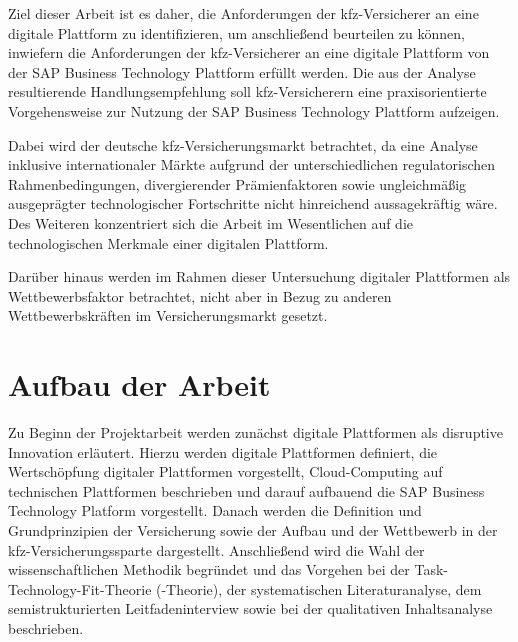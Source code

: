 Ziel dieser Arbeit ist es daher, die Anforderungen der \ac{kfz}-Versicherer an eine digitale Plattform zu identifizieren, um anschließend beurteilen zu können, inwiefern die Anforderungen der \ac{kfz}-Versicherer an eine digitale Plattform von der SAP Business Technology Plattform erfüllt werden. Die aus der Analyse resultierende Handlungsempfehlung soll \ac{kfz}-Versicherern eine praxisorientierte Vorgehensweise zur Nutzung der SAP Business Technology Plattform aufzeigen.

Dabei wird der deutsche \ac{kfz}-Versicherungsmarkt betrachtet, da eine Analyse inklusive internationaler Märkte aufgrund der unterschiedlichen regulatorischen Rahmenbedingungen, divergierender Prämienfaktoren sowie ungleichmäßig ausgeprägter technologischer Fortschritte nicht hinreichend aussagekräftig wäre. Des Weiteren konzentriert sich die Arbeit im Wesentlichen auf die technologischen Merkmale einer digitalen Plattform. 

Darüber hinaus werden im Rahmen dieser Untersuchung digitaler Plattformen als Wettbewerbsfaktor betrachtet, nicht aber in Bezug zu anderen Wettbewerbskräften im Versicherungsmarkt gesetzt.




\section{Aufbau der Arbeit}

Zu Beginn der Projektarbeit werden zunächst digitale Plattformen als disruptive Innovation erläutert. Hierzu werden digitale Plattformen definiert, die Wertschöpfung digitaler Plattformen vorgestellt, Cloud-Computing auf technischen Plattformen beschrieben und darauf aufbauend die SAP Business Technology Platform vorgestellt. Danach werden die Definition und Grundprinzipien der Versicherung sowie der Aufbau und der Wettbewerb in der \ac{kfz}-Versicherungssparte dargestellt. Anschließend wird die Wahl der wissenschaftlichen Methodik begründet und das Vorgehen bei der Task-Technology-Fit-Theorie (-Theorie), der systematischen Literaturanalyse, dem semistrukturierten Leitfadeninterview sowie bei der qualitativen Inhaltsanalyse beschrieben. \newpage

